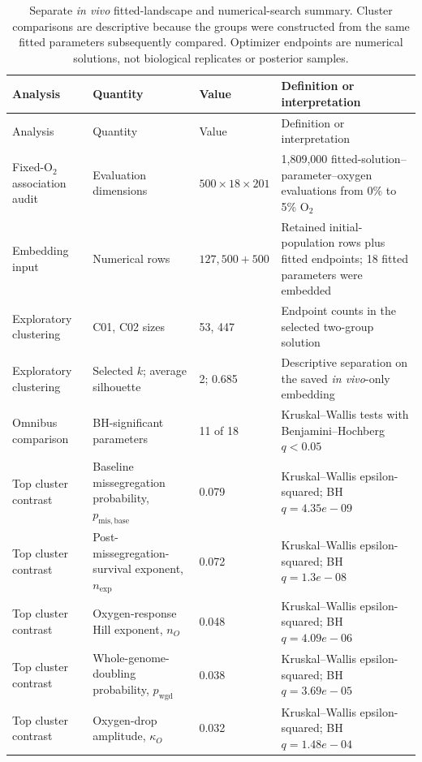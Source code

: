 \begingroup
\scriptsize
\setlength{\tabcolsep}{3.2pt}
\begin{longtable}{@{}p{}p{}p{}p{}@{}}
\caption{Separate \textit{in vivo} fitted-landscape and numerical-search summary. Cluster comparisons are descriptive because the groups were constructed from the same fitted parameters subsequently compared. Optimizer endpoints are numerical solutions, not biological replicates or posterior samples.}\label{tab:invivo_landscape_optimizer_summary}\\
\toprule
Analysis & Quantity & Value & Definition or interpretation \\
\midrule
\endfirsthead
\toprule
Analysis & Quantity & Value & Definition or interpretation \\
\midrule
\endhead
Fixed-O$_2$ association audit & Evaluation dimensions & $500\times18\times201$ & 1,809,000 fitted-solution--parameter--oxygen evaluations from 0\% to 5\% O$_2$ \\
Embedding input & Numerical rows & $127,500+500$ & Retained initial-population rows plus fitted endpoints; 18 fitted parameters were embedded \\
Exploratory clustering & C01, C02 sizes & 53, 447 & Endpoint counts in the selected two-group solution \\
Exploratory clustering & Selected $k$; average silhouette & 2; 0.685 & Descriptive separation on the saved \textit{in vivo}-only embedding \\
Omnibus comparison & BH-significant parameters & 11 of 18 & Kruskal--Wallis tests with Benjamini--Hochberg $q<0.05$ \\
\midrule
Top cluster contrast & Baseline missegregation probability, $p_{\mathrm{mis,base}}$ & 0.079 & Kruskal--Wallis epsilon-squared; BH $q=4.35e-09$ \\
Top cluster contrast & Post-missegregation-survival exponent, $n_{\mathrm{exp}}$ & 0.072 & Kruskal--Wallis epsilon-squared; BH $q=1.3e-08$ \\
Top cluster contrast & Oxygen-response Hill exponent, $n_O$ & 0.048 & Kruskal--Wallis epsilon-squared; BH $q=4.09e-06$ \\
Top cluster contrast & Whole-genome-doubling probability, $p_{\mathrm{wgd}}$ & 0.038 & Kruskal--Wallis epsilon-squared; BH $q=3.69e-05$ \\
Top cluster contrast & Oxygen-drop amplitude, $\kappa_O$ & 0.032 & Kruskal--Wallis epsilon-squared; BH $q=1.48e-04$ \\

\end{longtable}
